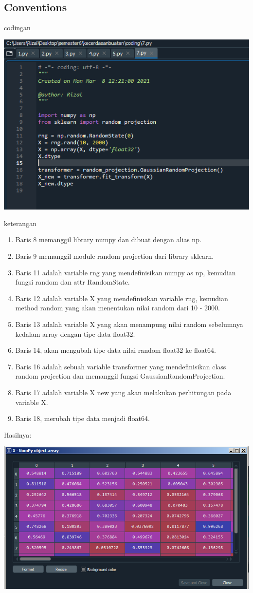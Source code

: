 \documentclass{article}
\begin{document}
\subsection{Conventions}
codingan

\begin{center}
    \includegraphics[width=.8\textwidth]{figures/1184033/chapter1/15.PNG}
\end{center}

keterangan
\begin{enumerate}
\item Baris 8 memanggil library numpy dan dibuat dengan alias np.
\item Baris 9 memanggil module random projection dari library sklearn.
\item Baris 11 adalah variable rng yang mendefinisikan numpy as np, kemudian fungsi random dan attr RandomState.
\item Baris 12 adalah variable X yang mendefinisikan variable rng, kemudian method random yang akan menentukan nilai random dari 10 - 2000.
\item Baris 13 adalah variable X yang akan menampung nilai random sebelumnya kedalam array dengan tipe data float32.
\item Baris 14, akan mengubah tipe data nilai random float32 ke float64.
\item Baris 16 adalah sebuah variable transformer yang mendefinisikan class random projection dan memanggil fungsi GaussianRandomProjection.
\item Baris 17 adalah variable X new yang akan melakukan perhitungan pada variable X.
\item Baris 18, merubah tipe data menjadi float64.
\end{enumerate}
Hasilnya:
\begin{center}
    \includegraphics[width=.8\textwidth]{figures/1184033/chapter1/17.PNG}
\end{center}
\end{document}
